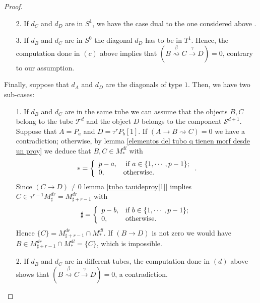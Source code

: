 \documentclass{amsart}
\theoremstyle{plain}
\theoremstyle{definition}
\begin{document}
\begin{proof}
\begin{itemize}
\begin{itemize}
        \item [2.] If $d_C$ and $d_D$ are in  $S^1$, we have the  case dual to the one considered above .\\

        \item  [3.] If $d_B$ and $d_C$ are in $S^0$ the diagonal $d_D$ has to be in  $T^1$. Hence, the computation done in  $(c)$ above implies  that $(B \stackrel{\beta} {\rightsquigarrow} C\stackrel {\gamma}{\rightarrow} D)=0$, contrary to our assumption.\\
      \end{itemize}

       Finally, suppose that $d_A$ and $d_D$ are the diagonals of type $1$. Then, we have two sub-cases:\\

       \begin{itemize}
         \item [1.] If $d_B$ and $d_C$ are in the same tube we can assume that the objects $B,C$  belong to the tube  $\mathcal{T}^{d}$ and the object $D$ belongs to the component $\mathcal{S}^{d+1}$. Suppose that $A=P_a$ and $D=\tau^r P_b[1]$. If
$(A\rightarrow B \rightsquigarrow C)=0$ we have a contradiction; otherwise, by lemma
\ref{elementos del tubo q tienen morf desde un proy}  we deduce that $B,C\in M_*^{dl}$ with $$*=\left\{
                     \begin{array}{ll}
                       p-a, & \hbox{ if $a\in\{1,\cdots, p-1\}$;} \\
                       0, & \hbox{otherwise.}
                     \end{array}
                   \right.
.$$ Since $(C\rightarrow
D)\neq 0$  lemma \ref{tubo tauideproy[1]}  implies $C\in
\tau^{r-1}M_\sharp^{dr}=M_{\sharp+r-1}^{dr}$ with $$\sharp=\left\{
                     \begin{array}{ll}
                       p-b, & \hbox{if $b\in\{1,\cdots, p-1\}$;} \\
                       0, & \hbox{otherwise.}
                     \end{array}
                   \right.
$$ Hence $\{C\}=M_{\sharp+r-1}^{dr}
\cap M_*^{dl}$. If $(B \rightarrow D)$ is not zero we would have
  $B\in M_{\sharp+r-1}^{dr} \cap M_*^{dl}= \{C\}$,
which is impossible.\\

         \item [2.] If $d_B$ and $d_C$ are in different tubes, the computation done in $(d)$ above shows that $(B \stackrel{\beta} {\rightsquigarrow} C\stackrel {\gamma}{\rightarrow} D)=0$, a contradiction.\\


\end{itemize}
\end{itemize}
\end{proof}
\end{document}
